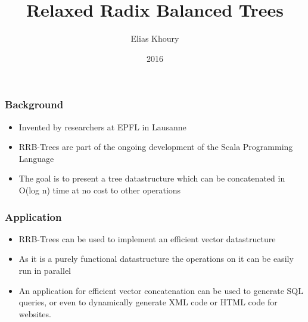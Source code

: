 \documentclass{beamer}
\title{Relaxed Radix Balanced Trees}
\author{Elias Khoury}
\date{2016}
\begin{document}
 
\frame{\titlepage}
 
\begin{frame}
\frametitle{Background}

\begin{itemize}

	\item Invented by researchers at EPFL in Lausanne\citep{bagwell2011rrb} \pause
	\item RRB-Trees are part of the ongoing development of the Scala Programming Language \pause
	\item The goal is to present a tree datastructure which can be concatenated in O(log n) time at no cost to other operations

\end{itemize}

\end{frame}
 
\begin{frame}

\frametitle{Application}

\begin{itemize}

	\item RRB-Trees can be used to implement an efficient vector datastructure
	\item As it is a purely functional datastructure the operations on it can be easily run in parallel\citep{stucki2015rrb} 
	\item An application for efficient vector concatenation can be used to generate SQL queries, or even to dynamically generate XML code or HTML code for websites. \citep{hull2006balancing}

\end{itemize}

\end{frame}
 
\end{document}
